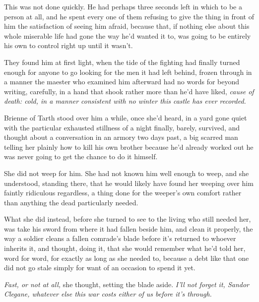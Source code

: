 This was not done quickly. He had perhaps three seconds left in which to be a person at all, and he spent every one of them refusing to give the thing in front of him the satisfaction of seeing him afraid, because that, if nothing else about this whole miserable life had gone the way he’d wanted it to, was going to be entirely his own to control right up until it wasn’t.

\sceneBreak

They found him at first light, when the tide of the fighting had finally turned enough for anyone to go looking for the men it had left behind, frozen through in a manner the maester who examined him afterward had no words for beyond writing, carefully, in a hand that shook rather more than he’d have liked, \textit{cause of death: cold, in a manner consistent with no winter this castle has ever recorded.}

Brienne of Tarth stood over him a while, once she’d heard, in a yard gone quiet with the particular exhausted stillness of a night finally, barely, survived, and thought about a conversation in an armory two days past, a big scarred man telling her plainly how to kill his own brother because he’d already worked out he was never going to get the chance to do it himself.

She did not weep for him. She had not known him well enough to weep, and she understood, standing there, that he would likely have found her weeping over him faintly ridiculous regardless, a thing done for the weeper’s own comfort rather than anything the dead particularly needed.

What she did instead, before she turned to see to the living who still needed her, was take his sword from where it had fallen beside him, and clean it properly, the way a soldier cleans a fallen comrade’s blade before it’s returned to whoever inherits it, and thought, doing it, that she would remember what he’d told her, word for word, for exactly as long as she needed to, because a debt like that one did not go stale simply for want of an occasion to spend it yet.

\textit{Fast, or not at all,} she thought, setting the blade aside. \textit{I’ll not forget it, Sandor Clegane, whatever else this war costs either of us before it’s through.}